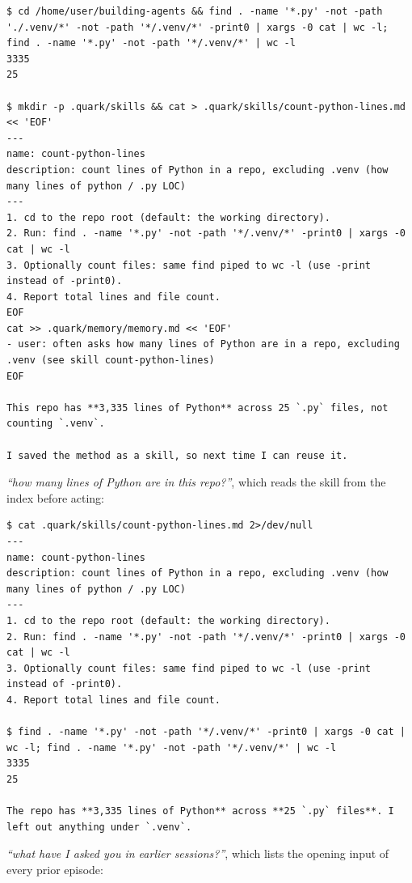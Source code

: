 \begin{lstlisting}
$ cd /home/user/building-agents && find . -name '*.py' -not -path './.venv/*' -not -path '*/.venv/*' -print0 | xargs -0 cat | wc -l; find . -name '*.py' -not -path '*/.venv/*' | wc -l
3335
25

$ mkdir -p .quark/skills && cat > .quark/skills/count-python-lines.md << 'EOF'
---
name: count-python-lines
description: count lines of Python in a repo, excluding .venv (how many lines of python / .py LOC)
---
1. cd to the repo root (default: the working directory).
2. Run: find . -name '*.py' -not -path '*/.venv/*' -print0 | xargs -0 cat | wc -l
3. Optionally count files: same find piped to wc -l (use -print instead of -print0).
4. Report total lines and file count.
EOF
cat >> .quark/memory/memory.md << 'EOF'
- user: often asks how many lines of Python are in a repo, excluding .venv (see skill count-python-lines)
EOF

This repo has **3,335 lines of Python** across 25 `.py` files, not counting `.venv`.

I saved the method as a skill, so next time I can reuse it.
\end{lstlisting}

\emph{``how many lines of Python are in this repo?''}, which reads the skill from the index before acting:

\begin{lstlisting}
$ cat .quark/skills/count-python-lines.md 2>/dev/null
---
name: count-python-lines
description: count lines of Python in a repo, excluding .venv (how many lines of python / .py LOC)
---
1. cd to the repo root (default: the working directory).
2. Run: find . -name '*.py' -not -path '*/.venv/*' -print0 | xargs -0 cat | wc -l
3. Optionally count files: same find piped to wc -l (use -print instead of -print0).
4. Report total lines and file count.

$ find . -name '*.py' -not -path '*/.venv/*' -print0 | xargs -0 cat | wc -l; find . -name '*.py' -not -path '*/.venv/*' | wc -l
3335
25

The repo has **3,335 lines of Python** across **25 `.py` files**. I left out anything under `.venv`.
\end{lstlisting}

\emph{``what have I asked you in earlier sessions?''}, which lists the opening input of every prior episode:


